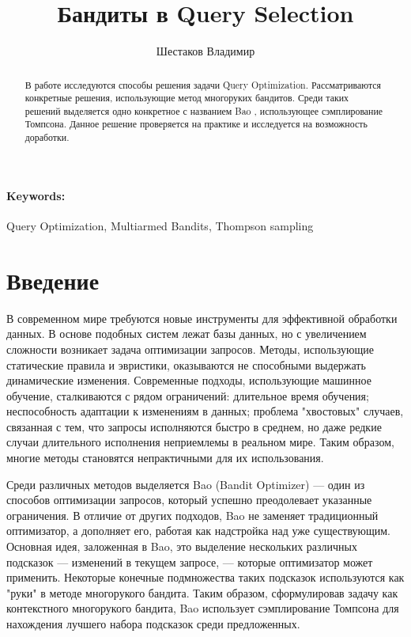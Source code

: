 \documentclass[12pt]{article}
\title{Бандиты в Query Selection}
\author{Шестаков Владимир}
\date{}
\begin{document}
\maketitle

\begin{abstract}
В работе исследуются способы решения задачи Query Optimization. Рассматриваются конкретные решения, использующие метод многоруких бандитов. Среди таких решений выделяется одно конкретное с названием Bao \cite{bao}, использующее сэмплирование Томпсона. Данное решение проверяется на практике и исследуется на возможность доработки.
\end{abstract}
\paragraph{Keywords:} Query Optimization, Multiarmed Bandits, Thompson sampling

\section{Введение}
В современном мире требуются новые инструменты для эффективной обработки данных. В основе подобных систем лежат базы данных, но с увеличением сложности возникает задача оптимизации запросов. Методы, использующие статические правила и эвристики, оказываются не способными выдержать динамические изменения. Современные подходы, использующие машинное обучение, сталкиваются с рядом ограничений: длительное время обучения; неспособность адаптации к изменениям в данных; проблема "хвостовых" случаев, связанная с тем, что запросы исполняются быстро в среднем, но даже редкие случаи длительного исполнения неприемлемы в реальном мире. Таким образом, многие методы становятся непрактичными для их использования.

Среди различных методов выделяется Bao (Bandit Optimizer) \cite{bao} — один из способов оптимизации запросов, который успешно преодолевает указанные ограничения. В отличие от других подходов, Bao не заменяет традиционный оптимизатор, а дополняет его, работая как надстройка над уже существующим. Основная идея, заложенная в Bao, это выделение нескольких различных подсказок — изменений в текущем запросе, — которые оптимизатор может применить. Некоторые конечные подмножества таких подсказок используются как "руки" в методе многорукого бандита. Таким образом, сформулировав задачу как контекстного многорукого бандита, Bao использует сэмплирование Томпсона для нахождения лучшего набора подсказок среди предложенных.
\end{document}
